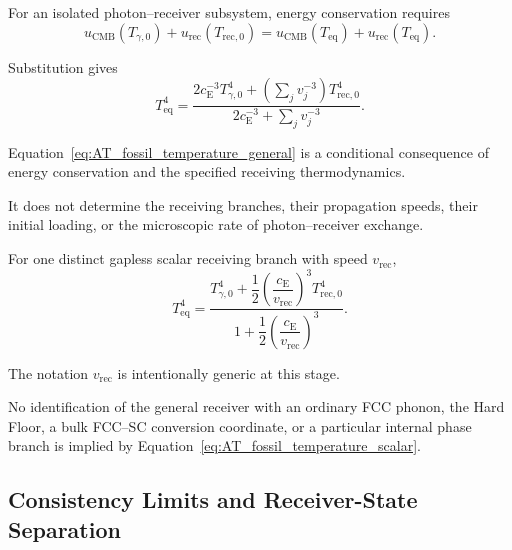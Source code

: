 For an isolated photon--receiver subsystem, energy conservation requires
\begin{equation}
    u_{\mathrm{CMB}}
    \left(
        T_{\gamma,0}
    \right)
    +
    u_{\mathrm{rec}}
    \left(
        T_{\mathrm{rec},0}
    \right)
    =
    u_{\mathrm{CMB}}
    \left(
        T_{\mathrm{eq}}
    \right)
    +
    u_{\mathrm{rec}}
    \left(
        T_{\mathrm{eq}}
    \right).
    \label{eq:AT_fossil_energy_conservation_general}
\end{equation}

Substitution gives
\begin{equation}
    T_{\mathrm{eq}}^4
    =
    \frac{
        2c_{\mathrm E}^{-3}
        T_{\gamma,0}^4
        +
        \left(
            \displaystyle\sum_j v_j^{-3}
        \right)
        T_{\mathrm{rec},0}^4
    }{
        2c_{\mathrm E}^{-3}
        +
        \displaystyle\sum_j v_j^{-3}
    }.
    \label{eq:AT_fossil_temperature_general}
\end{equation}

Equation~\eqref{eq:AT_fossil_temperature_general}
is a conditional consequence of energy conservation and the specified
receiving thermodynamics.

It does not determine the receiving branches, their propagation speeds, their
initial loading, or the microscopic rate of photon--receiver exchange.

For one distinct gapless scalar receiving branch with speed
\(v_{\mathrm{rec}}\),
\begin{equation}
    T_{\mathrm{eq}}^4
    =
    \frac{
        T_{\gamma,0}^4
        +
        \dfrac{1}{2}
        \left(
            \dfrac{c_{\mathrm E}}{v_{\mathrm{rec}}}
        \right)^3
        T_{\mathrm{rec},0}^4
    }{
        1
        +
        \dfrac{1}{2}
        \left(
            \dfrac{c_{\mathrm E}}{v_{\mathrm{rec}}}
        \right)^3
    }.
    \label{eq:AT_fossil_temperature_scalar}
\end{equation}

The notation
\(v_{\mathrm{rec}}\)
is intentionally generic at this stage.

No identification of the general receiver with an ordinary FCC phonon, the
Hard Floor, a bulk FCC--SC conversion coordinate, or a particular internal
phase branch is implied by
Equation~\eqref{eq:AT_fossil_temperature_scalar}.


\subsection{Consistency Limits and Receiver-State Separation}

